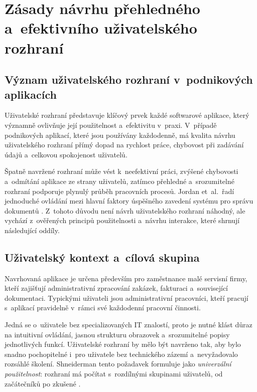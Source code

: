 \chapter{Zásady návrhu přehledného a~efektivního uživatelského rozhraní}\label{kap:uzivatelske-rozhrani}

\section{Význam uživatelského rozhraní v~podnikových aplikacích}

Uživatelské rozhraní představuje klíčový prvek každé softwarové aplikace, který významně ovlivňuje její použitelnost a~efektivitu v~praxi. V~případě podnikových aplikací, které jsou používány každodenně, má kvalita návrhu uživatelského rozhraní přímý dopad na rychlost práce, chybovost při zadávání údajů a~celkovou spokojenost uživatelů.

Špatně navržené rozhraní může vést k~neefektivní práci, zvýšené chybovosti a~odmítání aplikace ze strany uživatelů, zatímco přehledné a~srozumitelné rozhraní podporuje plynulý průběh pracovních procesů. Jordan et~al.\ řadí jednoduché ovládání mezi hlavní faktory úspěšného zavedení systému pro správu dokumentů \cite[s.~48]{Jordan2022}. Z~tohoto důvodu není návrh uživatelského rozhraní náhodný, ale vychází z~ověřených principů použitelnosti a~návrhu interakce, které shrnují následující oddíly.

\section{Uživatelský kontext a~cílová skupina}

Navrhovaná aplikace je určena především pro zaměstnance malé servisní firmy, kteří zajišťují administrativní zpracování zakázek, fakturaci a~související dokumentaci. Typickými uživateli jsou administrativní pracovníci, kteří pracují s~aplikací pravidelně v~rámci své každodenní pracovní činnosti.

Jedná se o~uživatele bez specializovaných IT znalostí, proto je nutné klást důraz na intuitivní ovládání, jasnou strukturu obrazovek a~srozumitelné popisy jednotlivých funkcí. Uživatelské rozhraní by mělo být navrženo tak, aby bylo snadno pochopitelné i~pro uživatele bez technického zázemí a~nevyžadovalo rozsáhlé školení. Shneiderman tento požadavek formuluje jako \emph{univerzální použitelnost}: rozhraní má počítat s~rozdílnými skupinami uživatelů, od začátečníků po zkušené \cite{Shneiderman-pravidla}.

